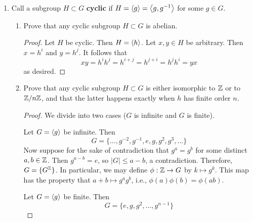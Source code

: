 \documentclass[../psets.tex]{subfiles}
\begin{document}
\begin{enumerate}
\begin{proof}
        To prove that $G$ is abelian, it will suffice to show that $xy=yx$ for all $x,y\in G$. Let $x,y\in G$ be arbitrary. Then
        \begin{equation*}
            xxyy = x^2y^2
            = \phi(x)\phi(y)
            = \phi(xy)
            = (xy)^2
            = xyxy
        \end{equation*}
        so by consecutive applications of the cancellation lemma, we have the desired result.
    \end{proof}
    \item Call a subgroup $H\subset G$ \textbf{cyclic} if $H=\left\langle{g}\right\rangle=\left\langle{g,g^{-1}}\right\rangle$ for some $g\in G$.
    \begin{enumerate}
        \item Prove that any cyclic subgroup $H\subset G$ is abelian.
        \begin{proof}
            Let $H$ be cyclic. Then $H=\left\langle{h}\right\rangle$. Let $x,y\in H$ be arbitrary. Then $x=h^i$ and $y=h^j$. It follows that
            \begin{equation*}
                xy = h^ih^j
                = h^{i+j}
                = h^{j+i}
                = h^jh^i
                = yx
            \end{equation*}
            as desired.
        \end{proof}
        \item Prove that any cyclic subgroup $H\subset G$ is either isomorphic to $\mathbb{Z}$ or to $\mathbb{Z}/n\mathbb{Z}$, and that the latter happens exactly when $h$ has finite order $n$.
        \begin{proof}
            We divide into two cases ($G$ is infinite and $G$ is finite).\par
            Let $G=\left\langle{g}\right\rangle$ be infinite. Then
            \begin{equation*}
                G = \{\dots,g^{-2},g^{-1},e,g,g^2,g^3,\dots\}
            \end{equation*}
            Now suppose for the sake of contradiction that $g^a=g^b$ for some distinct $a,b\in\mathbb{Z}$. Then $g^{a-b}=e$, so $|G|\leq a-b$, a contradiction. Therefore, $G=\{G^{\mathbb{Z}}\}$. In particular, we may define $\phi:\mathbb{Z}\to G$ by $k\mapsto g^k$. This map has the property that $a+b\mapsto g^ag^b$, i.e., $\phi(a)\phi(b)=\phi(ab)$.\par
            Let $G=\left\langle{g}\right\rangle$ be finite. Then
            \begin{equation*}
                G = \{e,g,g^2,\dots,g^{n-1}\}
            \end{equation*}

\end{proof}
\end{enumerate}
\end{enumerate}
\end{document}
